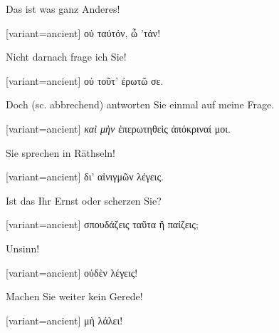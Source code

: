 Das ist was ganz Anderes! 

\switchcolumn

\begin{greek}[variant=ancient]%
οὐ ταὐτόν, ὦ 'τάν!

\end{greek}%
\switchcolumn*

Nicht darnach frage ich Sie! 

\switchcolumn

\begin{greek}[variant=ancient]%
οὐ τοῦτ' ἐρωτῶ σε.

\end{greek}%
\switchcolumn*

Doch (\textlatin{sc.} abbrechend) antworten Sie einmal auf meine Frage. 

\switchcolumn

\begin{greek}[variant=ancient]%
\emph{καὶ μὴν} ἐπερωτηθεὶς ἀπόκριναί μοι.

\end{greek}%
\switchcolumn*

Sie sprechen in Räthseln! 

\switchcolumn

\begin{greek}[variant=ancient]%
δι' αἰνιγμῶν λέγεις.

\end{greek}%
\switchcolumn*

Ist das Ihr Ernst oder scherzen Sie? 

\switchcolumn

\begin{greek}[variant=ancient]%
σπουδάζεις ταῦτα ἢ παίζεις;

\end{greek}%
\switchcolumn*

Unsinn! 

\switchcolumn

\begin{greek}[variant=ancient]%
οὐδὲν λέγεις!

\end{greek}%
\switchcolumn*

Machen Sie weiter kein Gerede! 

\switchcolumn

\begin{greek}[variant=ancient]%
μὴ λάλει!

\end{greek}%
\switchcolumn*

